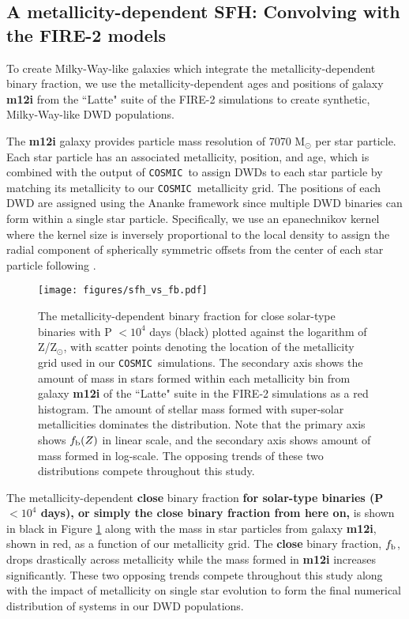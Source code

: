 \documentclass[twocolumn, linenumbers]{aastex631}
\newcommand{\cosmic}{\texttt{COSMIC}}
\begin{document}
\subsection{A metallicity-dependent SFH: Convolving with the FIRE-2 models}
\label{sec:FIRE}
To create Milky-Way-like galaxies which integrate the metallicity-dependent binary fraction, we use the metallicity-dependent ages and positions of galaxy \textbf{m12i} from the ``Latte" suite of the FIRE-2 simulations \citep{Hopkins2015, Wetzel2016, Hopkins2018} to create synthetic, Milky-Way-like DWD populations. 

The \textbf{m12i} galaxy provides particle mass resolution of 7070 M$_\odot$ per star particle. Each star particle has an associated metallicity, position, and age, which is combined with the output of \cosmic\ to assign DWDs to each star particle by matching its metallicity to our \cosmic\ metallicity grid. The positions of each DWD are assigned using the Ananke framework since multiple DWD binaries can form within a single star particle. Specifically, we use an epanechnikov kernel where the kernel size is inversely proportional to the local density to assign the radial component of spherically symmetric offsets from the center of each star particle following \citet{Sanderson2020}. 

\begin{figure}
	\texttt{[image: figures/sfh\_vs\_fb.pdf]}
    \caption{The metallicity-dependent binary fraction for close solar-type binaries with P $< 10^4$ days (black) plotted against the logarithm of Z/Z$_\odot$, with scatter points denoting the location of the metallicity grid used in our \cosmic\ simulations. The secondary axis shows the amount of mass in stars formed within each metallicity bin from galaxy \textbf{m12i} of the ``Latte" suite in the FIRE-2 simulations as a red histogram. The amount of stellar mass formed with super-solar metallicities dominates the distribution. Note that the primary axis shows $f_{\rm{b}}(Z)$ in linear scale, and the secondary axis shows amount of mass formed in log-scale. The opposing trends of these two distributions compete throughout this study.}
    \label{fig:sfh_vs_fb}
\end{figure}

The metallicity-dependent \textbf{close} binary fraction \textbf{for solar-type binaries (P $< 10^4$ days), or simply the close binary fraction from here on, } is shown in black in Figure \ref{fig:sfh_vs_fb} along with the mass in star particles from galaxy \textbf{m12i}, shown in red, as a function of our metallicity grid. The \textbf{close} binary fraction, $f_{\rm{b}}$, drops drastically across metallicity while the mass formed in \textbf{m12i} increases significantly. These two opposing trends compete throughout this study along with the impact of metallicity on single star evolution to form the final numerical distribution of systems in our DWD populations. 
\end{document}
